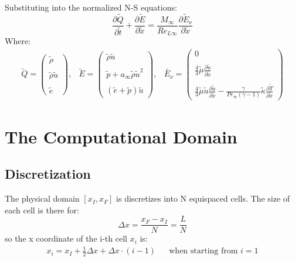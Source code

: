 \documentclass[11pt, a4paper]{article}
\newcommand{\parder}[2]{\frac{\partial {#1}}{\partial {#2}}}
\begin{document}
Substituting into the normalized N-S equations:
\begin{equation}
    \parder{\tilde{Q}}{\tilde{t}}+\parder{\tilde{E}}{\tilde{x}}=\frac{M_\infty}{Re_{L\infty}}\parder{\tilde{E}_\nu}{\tilde{x}}
\end{equation}
Where:
\begin{equation}
    \begin{matrix}
        \tilde{Q}=\begin{pmatrix}
        \tilde{\rho} \\\\
        \tilde{\rho}\tilde{u} \\\\
        \tilde{e}
        \end{pmatrix}, & \tilde{E}=\begin{pmatrix}
        \tilde{\rho}\tilde{u} \\\\
        \tilde{p}+a_\infty\tilde{\rho}\tilde{u}^2 \\\\
        \left(\tilde{e}+\tilde{p}\right)\tilde{u}
        \end{pmatrix}, & \tilde{E_\nu}=\begin{pmatrix}
        0 \\\\
        \displaystyle\frac{4}{3}\tilde{\mu} \parder{\tilde{u}}{\tilde{x}} \\\\
        \displaystyle\frac{4}{3}\tilde{\mu}\tilde{u}\parder{\tilde{u}}{\tilde{x}}-\frac{\gamma}{Pr_\infty\left(\gamma-1\right)}\tilde{\kappa}\parder{\tilde{T}}{\tilde{x}}
        \end{pmatrix}
    \end{matrix}
\end{equation}

\section{The Computational Domain}
\subsection{Discretization}
The physical domain $\left[x_I,x_F\right]$ is discretizes into N equispaced cells. The size of each cell is there for:
\begin{equation}
    \Delta x=\frac{x_F-x_I}{N}=\frac{L}{N}
\end{equation}
so the x coordinate of the i-th cell $x_i$ is:
\begin{equation}
    \begin{matrix}
        \displaystyle x_i=x_I+\frac{1}{2}\Delta x+\Delta x\cdot\left(i-1\right) && \text{when starting from $i=1$}
    \end{matrix}
\end{equation}
\end{document}
